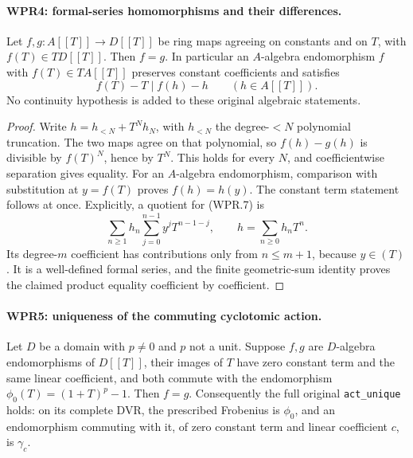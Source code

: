 \documentclass[11pt,a4paper]{article}
\numberwithin{equation}{section}
\theoremstyle{remark}\newtheorem{remark}[theorem]{Remark}
\begin{document}
\paragraph{WPR4: formal-series homomorphisms and their differences.}
\label{claim:WPR4}
Let $f,g:A[[T]]\to D[[T]]$ be ring maps agreeing on constants
and on $T$, with $f(T)\in TD[[T]]$. Then $f=g$.
In particular an $A$-algebra endomorphism $f$ with $f(T)\in TA[[T]]$
preserves constant coefficients and satisfies
\[
                         f(T)-T\mid f(h)-h
                  \qquad(h\in A[[T]]).
 \tag{WPR.7}
\]
No continuity hypothesis is added to these original algebraic statements.

\begin{proof}
Write $h=h_{<N}+T^Nh_N$, with $h_{<N}$ the degree-$<N$
polynomial truncation. The two maps agree on that polynomial,
so $f(h)-g(h)$ is divisible by $f(T)^N$, hence by $T^N$.
This holds for every $N$, and coefficientwise separation gives
equality. For an $A$-algebra endomorphism, comparison with
substitution at $y=f(T)$ proves $f(h)=h(y)$. The constant term
statement follows at once. Explicitly, a quotient for (WPR.7) is
\[
 \sum_{n\geq1}h_n\sum_{j=0}^{n-1}y^jT^{n-1-j},
              \qquad h=\sum_{n\geq0}h_nT^n.
\]
Its degree-$m$ coefficient has contributions only from $n\leq m+1$,
because $y\in(T)$. It is a well-defined formal series, and the
finite geometric-sum identity proves the claimed product equality
coefficient by coefficient.
\end{proof}

\paragraph{WPR5: uniqueness of the commuting cyclotomic action.}
\label{claim:WPR5}
Let $D$ be a domain with $p\neq0$ and $p$ not a unit.
Suppose $f,g$ are $D$-algebra endomorphisms of $D[[T]]$,
their images of $T$ have zero constant term and the same linear
coefficient, and both commute with the endomorphism
$\phi_0(T)=(1+T)^p-1$. Then $f=g$.
Consequently the full original \texttt{act\_\allowbreak unique} holds:
on its complete DVR, the prescribed Frobenius is $\phi_0$,
and an endomorphism commuting with it, of zero constant term and
linear coefficient $c$, is $\gamma_c$.
\end{document}
